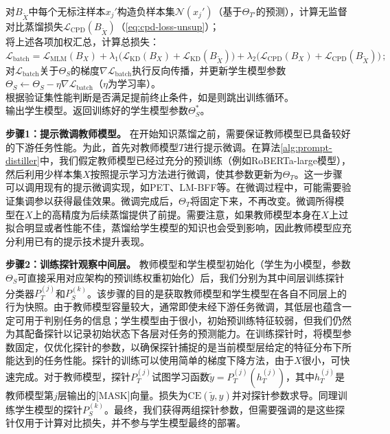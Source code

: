 \documentclass[../main.tex]{subfiles}
\begin{document}
\begin{algorithm}[t]
{{			对$B_{\tilde{X}}$中每个无标注样本$x_j'$构造负样本集$\mathcal{N}(x_j')$（基于$\Theta_{T'}$的预测），计算无监督对比蒸馏损失$\mathcal{L}_{\text{CPD}}(B_{\tilde{X}})$（\eqref{eq:cpd-loss-unsup}）；\\
			将上述各项加权汇总，计算总损失：
			$
				\mathcal{L}_{\text{batch}} = \mathcal{L}_{\text{MLM}}(B_X) + \lambda_1 \Big( \mathcal{L}_{\text{KD}}(B_X) + \mathcal{L}_{\text{KD}}(B_{\tilde{X}}) \Big) + \lambda_2 \Big( \mathcal{L}_{\text{CPD}}(B_X) + \mathcal{L}_{\text{CPD}}(B_{\tilde{X}}) \Big)\,;
			$
			对$\mathcal{L}_{\text{batch}}$关于$\Theta_S$的梯度$\nabla \mathcal{L}_{\text{batch}}$执行反向传播，并更新学生模型参数$\Theta_S \leftarrow \Theta_S - \eta \nabla \mathcal{L}_{\text{batch}}$（$\eta$为学习率）。\\
		} %
		根据验证集性能判断是否满足提前终止条件，如是则跳出训练循环。\\
	} %
	输出学生模型。返回训练好的学生模型参数$\Theta_S^*$。
\end{algorithm}

\textbf{步骤1：提示微调教师模型。} 在开始知识蒸馏之前，需要保证教师模型已具备较好的下游任务性能。为此，首先对教师模型$T$进行提示微调。在算法\ref{alg:prompt-distiller}中，我们假定教师模型已经过充分的预训练（例如RoBERTa-large模型），然后利用少样本集$X$按照提示学习方法进行微调，使其参数更新为$\Theta_T$。这一步骤可以调用现有的提示微调实现，如PET、LM-BFF等。在微调过程中，可能需要验证集调参以获得最佳效果。微调完成后，$\Theta_T$将固定下来，不再改变。微调所得模型在$X$上的高精度为后续蒸馏提供了前提。需要注意，如果教师模型本身在$X$上过拟合明显或者性能不佳，蒸馏给学生模型的知识也会受到影响，因此教师模型应充分利用已有的提示技术提升表现。

\textbf{步骤2：训练探针观察中间层。} 教师模型和学生模型初始化（学生为小模型，参数$\Theta_S$可直接采用对应架构的预训练权重初始化）后，我们分别为其中间层训练探针分类器$P_T^{(j)}$和$P_S^{(k)}$。该步骤的目的是获取教师模型和学生模型在各自不同层上的行为快照。由于教师模型容量较大，通常即使未经下游任务微调，其低层也蕴含一定可用于判别任务的信息；学生模型由于很小，初始预训练特征较弱，但我们仍然为其配备探针以记录初始状态下各层对任务的预测能力。在训练探针时，将模型参数固定，仅优化探针的参数，以确保探针捕捉的是当前模型层给定的特征分布下所能达到的任务性能。探针的训练可以使用简单的梯度下降方法，由于$X$很小，可快速完成。对于教师模型，探针$P_T^{(j)}$试图学习函数$\tilde{y}=P_T^{(j)}(h_T^{(j)})$，其中$h_T^{(j)}$是教师模型第$j$层输出的[MASK]向量。损失为$\text{CE}(\tilde{y}, y)$并对探针参数求导。同理训练学生模型的探针$P_S^{(k)}$。最终，我们获得两组探针参数，但需要强调的是这些探针仅用于计算对比损失，并不参与学生模型最终的部署。
\end{document}
